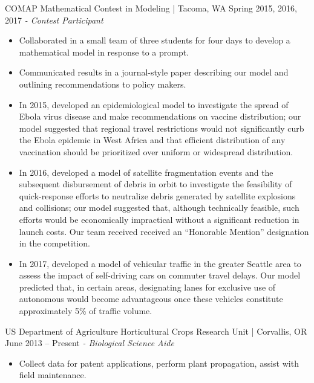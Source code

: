 COMAP Mathematical Contest in Modeling | Tacoma, WA \hfill Spring 2015, 2016, 2017 \newline
\textit{- Contest Participant} \\
  \vspace{-4.5mm}
 \begin{itemize}
 \item Collaborated in a small team of three students for four days to develop a mathematical model in response to a prompt.
 \item Communicated results in a journal-style paper describing our model and outlining recommendations to policy makers.
 \item In 2015, developed an epidemiological model to investigate the spread of Ebola virus disease and make recommendations on vaccine distribution; our model suggested that regional travel restrictions would not significantly curb the Ebola epidemic in West Africa and that efficient distribution of any vaccination should be prioritized over uniform or widespread distribution.
 \item In 2016, developed a model of satellite fragmentation events and the subsequent disbursement of debris in orbit to investigate the feasibility of quick-response efforts to neutralize debris generated by satellite explosions and collisions; our model suggested that, although technically feasible, such efforts would be economically impractical without a significant reduction in launch costs. Our team received received an ``Honorable Mention'' designation in the competition.
 \item In 2017, developed a model of vehicular traffic in the greater Seattle area to assess the impact of self-driving cars on commuter travel delays. Our model predicted that, in certain areas, designating lanes for exclusive use of autonomous would become advantageous once these vehicles constitute approximately 5\% of traffic volume.
 \end{itemize}
  \vspace{-3.5mm}

US Department of Agriculture Horticultural Crops Research Unit | Corvallis, OR  \hfill  June 2013 – Present \newline
\textit{- Biological Science Aide}\\
  \vspace{-4.5mm}
 \begin{itemize}
 \item Collect data for patent applications, perform plant propagation, assist with field maintenance.
 \end{itemize}
  \vspace{-3.5mm}
 
